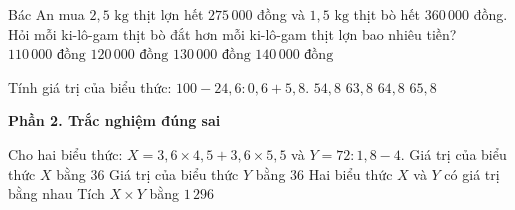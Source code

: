 \begin{ex} %
Bác An mua $2{,}5\text{ kg}$ thịt lợn hết $275\,000$ đồng và $1{,}5\text{ kg}$ thịt bò hết $360\,000$ đồng. Hỏi mỗi ki-lô-gam thịt bò đắt hơn mỗi ki-lô-gam thịt lợn bao nhiêu tiền?
\choice
{$110\,000\text{ đồng}$}
{$120\,000\text{ đồng}$}
{\True $130\,000\text{ đồng}$}
{$140\,000\text{ đồng}$}
\end{ex}

\begin{ex} %
Tính giá trị của biểu thức: $100 - 24{,}6 : 0{,}6 + 5{,}8$.
\choice
{$54{,}8$}
{$63{,}8$}
{\True $64{,}8$}
{$65{,}8$}
\end{ex}

\textbf{Phần 2. Trắc nghiệm đúng sai}

\begin{ex} %
Cho hai biểu thức: $X = 3{,}6 \times 4{,}5 + 3{,}6 \times 5{,}5$ và $Y = 72 : 1{,}8 - 4$.
\choiceTF
{\True Giá trị của biểu thức $X$ bằng $36$}
{\True Giá trị của biểu thức $Y$ bằng $36$}
{\True Hai biểu thức $X$ và $Y$ có giá trị bằng nhau}
{\True Tích $X \times Y$ bằng $1\,296$}
\end{ex}

